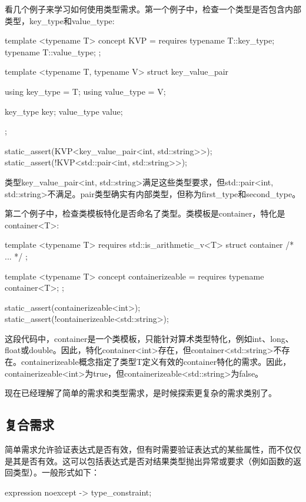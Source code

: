 看几个例子来学习如何使用类型需求。第一个例子中，检查一个类型是否包含内部类型，key_type和value_type:

\begin{cppcode}
template <typename T>
concept KVP = requires
{
	typename T::key_type;
	typename T::value_type;
};

template <typename T, typename V>
struct key_value_pair
{
	using key_type = T;
	using value_type = V;
	
	key_type key;
	value_type value;
};

static_assert(KVP<key_value_pair<int, std::string>>);
static_assert(!KVP<std::pair<int, std::string>>);
\end{cppcode}

类型key_value_pair<int, std::string>满足这些类型要求，但std::pair<int, std::string>不满足。pair类型确实有内部类型，但称为first_type和second_type。

第二个例子中，检查类模板特化是否命名了类型。类模板是container，特化是container<T>:

\begin{cppcode}
template <typename T>
requires std::is_arithmetic_v<T>
struct container
{ /* ... */ };

template <typename T>
concept containerizeable = requires {
	typename container<T>;
};

static_assert(containerizeable<int>);
static_assert(!containerizeable<std::string>);
\end{cppcode}

这段代码中，container是一个类模板，只能针对算术类型特化，例如int、long、float或double。因此，特化container<int>存在，但container<std::string>不存在。containerizeable概念指定了类型T定义有效的container特化的需求。因此，containerizeable<int>为true，但containerizeable<std::string>为false。

现在已经理解了简单的需求和类型需求，是时候探索更复杂的需求类别了。

\subsection{复合需求}

简单需求允许验证表达式是否有效，但有时需要验证表达式的某些属性，而不仅仅是其是否有效。这可以包括表达式是否对结果类型抛出异常或要求（例如函数的返回类型）。一般形式如下：

\begin{cppcode}
{ expression } noexcept -> type_constraint;
\end{cppcode}

